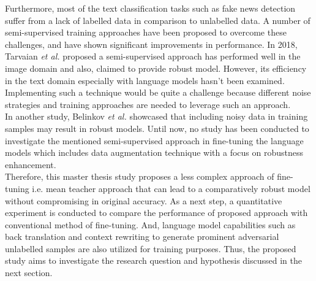 \documentclass[%
	BCOR=8mm, %
	DIV=12,
	toc=bibliography, %
	toc=listof, %
	oneside, %
	egregdoesnotlikesansseriftitles, %
	]{scrbook}
\begin{document}
Furthermore, most of the text classification tasks such as fake news detection suffer from a lack of labelled data in comparison to unlabelled data. A number of semi-supervised training approaches have been proposed to overcome these challenges, and  have shown significant improvements in performance. In 2018, Tarvaian \textit{et al.} \cite{tarvainen_mean_2018} proposed a semi-supervised approach has performed well in the image domain and also, claimed to provide robust model. However, its efficiency in the text domain especially with language models hasn't been examined. Implementing such a technique would be quite a challenge because different noise strategies and training approaches are needed to leverage such an approach.\\
In another study, Belinkov \textit{et al.} \cite{belinkov_synthetic_2018} showcased that including noisy data in training samples may result in robust models.  Until now, no study has been conducted to investigate the mentioned semi-supervised approach in fine-tuning the language models which includes data augmentation technique with a focus on robustness enhancement. \\
Therefore, this master thesis study proposes a less complex approach of fine-tuning i.e. mean teacher approach that can lead to a comparatively robust model without compromising in original accuracy. As a next step, a quantitative experiment is conducted to compare the performance of proposed approach with conventional method of fine-tuning. And, language model capabilities such as back translation and context rewriting to generate prominent adversarial unlabelled samples are also utilized for training purposes. Thus, the proposed study aims to investigate the research question and hypothesis discussed in the next section.
\end{document}
